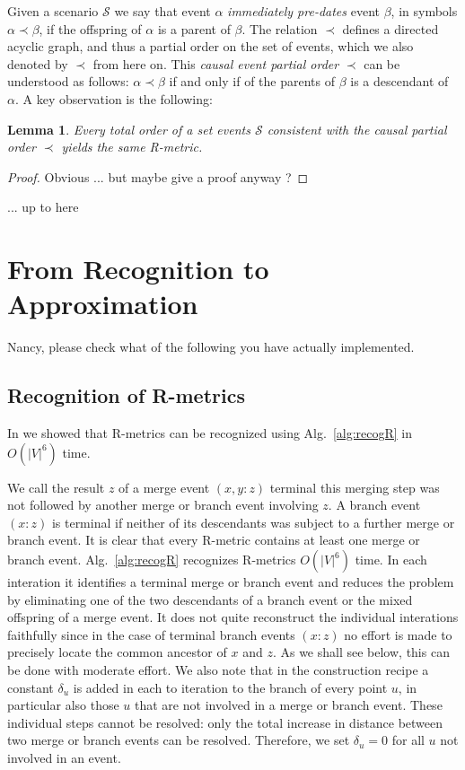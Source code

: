 \documentclass[amsmath]{lni}
\newtheorem{lemma}[theorem]{Lemma}
\newcommand{\TODO}[1]{\begingroup\color{red}#1\endgroup}
\begin{document}
Given a scenario $\mathcal{S}$ we say that event $\alpha$ \emph{immediately
  pre-dates} event $\beta$, in symbols $\alpha \prec\beta$, if the
offspring of $\alpha$ is a parent of $\beta$. The relation $\prec$ defines
a directed acyclic graph, and thus a partial order on the set of events,
which we also denoted by $\prec$ from here on. This \emph{causal event
  partial order} $\prec$ can be understood as follows: $\alpha\prec\beta$
if and only if of the parents of $\beta$ is a descendant of $\alpha$. A key
observation is the following:
\begin{lemma}
  Every total order of a set events $\mathcal{S}$ consistent with the
  causal partial order $\prec$ yields the same R-metric.
\end{lemma}
\begin{proof}
  Obvious ... but maybe give a proof anyway ? 
\end{proof}

\TODO{... up to here} 

\section{From Recognition to Approximation} 

\TODO{Nancy, please check what of the following you have actually
  implemented.} 

\subsection{Recognition of R-metrics}

In \cite{Prohaska:17a} we showed that R-metrics can be recognized using
Alg.~\ref{alg:recogR} in $O(|V|^6)$ time.

We call the result $z$ of a merge event $(x,y:z)$ terminal this merging
step was not followed by another merge or branch event involving $z$. A
branch event $(x:z)$ is terminal if neither of its descendants was subject
to a further merge or branch event. It is clear that every R-metric
contains at least one merge or branch event. Alg.~\ref{alg:recogR}
\cite{Prohaska:17a} recognizes R-metrics $O(|V|^6)$ time. In each
interation it identifies a terminal merge or branch event and reduces the
problem by eliminating one of the two descendants of a branch event or the
mixed offspring of a merge event. It does not quite reconstruct the
individual interations faithfully since in the case of terminal branch
events $(x:z)$ no effort is made to precisely locate the common ancestor of
$x$ and $z$. As we shall see below, this can be done with moderate effort.
We also note that in the construction recipe a constant $\delta_u$ is added
in each to iteration to the branch of every point $u$, in particular also
those $u$ that are not involved in a merge or branch event. These
individual steps cannot be resolved: only the total increase in distance
between two merge or branch events can be resolved. Therefore, we set
$\delta_u=0$ for all $u$ not involved in an event. 
\end{document}
